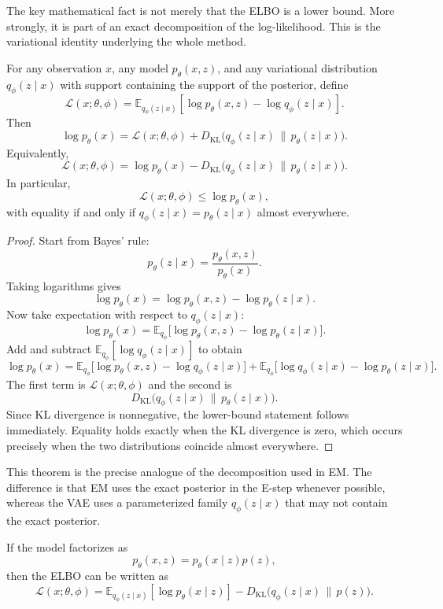 The key mathematical fact is not merely that the ELBO is a lower bound.
More strongly, it is part of an exact decomposition of the log-likelihood.
This is the variational identity underlying the whole method.

\begin{theorem}
For any observation $x$, any model $p_\theta(x,z)$, and any variational distribution $q_\phi(z\mid x)$ with support containing the support of the posterior, define
\[
\mathcal L(x;\theta,\phi)
=
\mathbb E_{q_\phi(z\mid x)}\left[\log p_\theta(x,z)-\log q_\phi(z\mid x)\right].
\]
Then
\[
\log p_\theta(x)
=
\mathcal L(x;\theta,\phi)
+
D_{\mathrm{KL}}\bigl(q_\phi(z\mid x)\,\|\,p_\theta(z\mid x)\bigr).
\]
Equivalently,
\[
\mathcal L(x;\theta,\phi)
=
\log p_\theta(x)
-
D_{\mathrm{KL}}\bigl(q_\phi(z\mid x)\,\|\,p_\theta(z\mid x)\bigr).
\]
In particular,
\[
\mathcal L(x;\theta,\phi)\le \log p_\theta(x),
\]
with equality if and only if $q_\phi(z\mid x)=p_\theta(z\mid x)$ almost everywhere.
\end{theorem}

\begin{proof}
Start from Bayes' rule:
\[
p_\theta(z\mid x)=\frac{p_\theta(x,z)}{p_\theta(x)}.
\]
Taking logarithms gives
\[
\log p_\theta(x)=\log p_\theta(x,z)-\log p_\theta(z\mid x).
\]
Now take expectation with respect to $q_\phi(z\mid x)$:
\[
\log p_\theta(x)
=
\mathbb E_{q_\phi}\bigl[\log p_\theta(x,z)-\log p_\theta(z\mid x)\bigr].
\]
Add and subtract $\mathbb E_{q_\phi}[\log q_\phi(z\mid x)]$ to obtain
\[
\log p_\theta(x)
=
\mathbb E_{q_\phi}\bigl[\log p_\theta(x,z)-\log q_\phi(z\mid x)\bigr]
+
\mathbb E_{q_\phi}\bigl[\log q_\phi(z\mid x)-\log p_\theta(z\mid x)\bigr].
\]
The first term is $\mathcal L(x;\theta,\phi)$ and the second is
\[
D_{\mathrm{KL}}\bigl(q_\phi(z\mid x)\,\|\,p_\theta(z\mid x)\bigr).
\]
Since KL divergence is nonnegative, the lower-bound statement follows immediately.
Equality holds exactly when the KL divergence is zero, which occurs precisely when the two distributions coincide almost everywhere.
\end{proof}

This theorem is the precise analogue of the decomposition used in EM.
The difference is that EM uses the exact posterior in the E-step whenever possible, whereas the VAE uses a parameterized family $q_\phi(z\mid x)$ that may not contain the exact posterior.

\begin{proposition}
If the model factorizes as
\[
p_\theta(x,z)=p_\theta(x\mid z)p(z),
\]
then the ELBO can be written as
\[
\mathcal L(x;\theta,\phi)
=
\mathbb E_{q_\phi(z\mid x)}[\log p_\theta(x\mid z)]
-
D_{\mathrm{KL}}\bigl(q_\phi(z\mid x)\,\|\,p(z)\bigr).
\]
\end{proposition}

